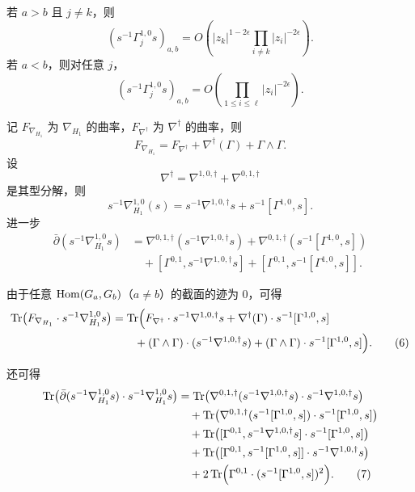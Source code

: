 \begin{lemma}
若 \(a>b\) 且 \(j\ne k\)，则
\[
(s^{-1}\Gamma_j^{1,0}s)_{a,b}
=
O\left(
|z_k|^{1-2\epsilon}\prod_{i\ne k}|z_i|^{-2\epsilon}
\right).
\]
若 \(a<b\)，则对任意 \(j\)，
\[
(s^{-1}\Gamma_j^{1,0}s)_{a,b}
=
O\left(
\prod_{1\le i\le \ell}|z_i|^{-2\epsilon}
\right).
\]
\end{lemma}

记 \(F_{\nabla_{H_1}}\) 为 \(\nabla_{H_1}\) 的曲率，\(F_{\nabla^\dagger}\) 为 \(\nabla^\dagger\) 的曲率，则
\[
F_{\nabla_{H_1}}=F_{\nabla^\dagger}+\nabla^\dagger(\Gamma)+\Gamma\wedge \Gamma.
\]
设
\[
\nabla^\dagger=\nabla^{1,0,\dagger}+\nabla^{0,1,\dagger}
\]
是其型分解，则
\[
s^{-1}\nabla^{1,0}_{H_1}(s)=s^{-1}\nabla^{1,0,\dagger}s+s^{-1}[\Gamma^{1,0},s].
\]
进一步
\begin{align}
\bar\partial(s^{-1}\nabla^{1,0}_{H_1}s)
&=
\nabla^{0,1,\dagger}(s^{-1}\nabla^{1,0,\dagger}s)
+\nabla^{0,1,\dagger}(s^{-1}[\Gamma^{1,0},s]) \nonumber\\
&\quad
+[\Gamma^{0,1},s^{-1}\nabla^{1,0,\dagger}s]
+[\Gamma^{0,1},s^{-1}[\Gamma^{1,0},s]]. \tag{5}
\end{align}

由于任意 \(\operatorname{Hom}(G_a,G_b)\)（\(a\ne b\)）的截面的迹为 0，可得
\begin{align}
\operatorname{Tr}\bigl(F_{\nabla_{H_1}}\cdot s^{-1}\nabla^{1,0}_{H_1}s\bigr)
&=
\operatorname{Tr}\Bigl(
F_{\nabla^\dagger}\cdot s^{-1}\nabla^{1,0,\dagger}s
+\nabla^\dagger(\Gamma)\cdot s^{-1}[\Gamma^{1,0},s]\nonumber\\
&\qquad
+(\Gamma\wedge\Gamma)\cdot(s^{-1}\nabla^{1,0,\dagger}s)
+(\Gamma\wedge\Gamma)\cdot s^{-1}[\Gamma^{1,0},s]
\Bigr). \tag{6}
\end{align}

还可得
\begin{align}
\operatorname{Tr}\bigl(\bar\partial(s^{-1}\nabla^{1,0}_{H_1}s)\cdot s^{-1}\nabla^{1,0}_{H_1}s\bigr)
&=
\operatorname{Tr}\bigl(\nabla^{0,1,\dagger}(s^{-1}\nabla^{1,0,\dagger}s)\cdot s^{-1}\nabla^{1,0,\dagger}s\bigr)\nonumber\\
&\quad
+\operatorname{Tr}\bigl(\nabla^{0,1,\dagger}(s^{-1}[\Gamma^{1,0},s])\cdot s^{-1}[\Gamma^{1,0},s]\bigr)\nonumber\\
&\quad
+\operatorname{Tr}\bigl([\Gamma^{0,1},s^{-1}\nabla^{1,0,\dagger}s]\cdot s^{-1}[\Gamma^{1,0},s]\bigr)\nonumber\\
&\quad
+\operatorname{Tr}\bigl([\Gamma^{0,1},s^{-1}[\Gamma^{1,0},s]]\cdot s^{-1}\nabla^{1,0,\dagger}s\bigr)\nonumber\\
&\quad
+2\operatorname{Tr}\Bigl(\Gamma^{0,1}\cdot (s^{-1}[\Gamma^{1,0},s])^2\Bigr). \tag{7}
\end{align}

